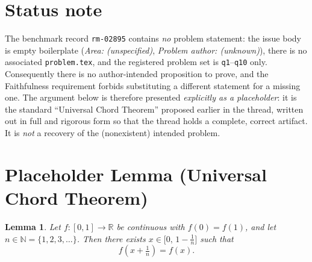 \documentclass{article}
\newtheorem{lemma}{Lemma}
\begin{document}
\section*{Status note}

The benchmark record \texttt{rm-02895} contains \emph{no} problem statement:
the issue body is empty boilerplate (\textit{Area: (unspecified)},
\textit{Problem author: (unknown)}), there is no associated
\texttt{problem.tex}, and the registered problem set is \texttt{q1}--\texttt{q10}
only. Consequently there is no author-intended proposition to prove, and the
Faithfulness requirement forbids substituting a different statement for a
missing one. The argument below is therefore presented \emph{explicitly as a
placeholder}: it is the standard ``Universal Chord Theorem'' proposed earlier
in the thread, written out in full and rigorous form so that the thread holds a
complete, correct artifact. It is \emph{not} a recovery of the (nonexistent)
intended problem.

\section*{Placeholder Lemma (Universal Chord Theorem)}

\begin{lemma}
Let $f:[0,1]\to\mathbb{R}$ be continuous with $f(0)=f(1)$, and let
$n\in\mathbb{N}=\{1,2,3,\dots\}$. Then there exists
$x\in\bigl[0,\,1-\tfrac1n\bigr]$ such that
\[
  f\!\left(x+\tfrac1n\right)=f(x).
\]
\end{lemma}
\end{document}
